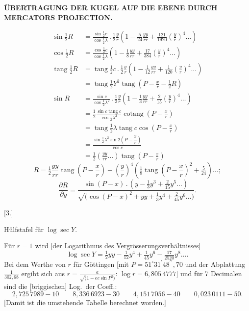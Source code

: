 \par\clearpage
\noindent\null\hfill{\fontsize{8}{10}\selectfont\textbf{ÜBERTRAGUNG DER KUGEL AUF DIE EBENE DURCH MERCATORS PROJECTION.}}\hfill{}\par\medskip

\noindent [so wird]
\[
\begin{aligned}
\sin\tfrac12R
 &=\frac{\sin\tfrac12 c}{\cos\tfrac12\lambda}\,.\,\tfrac12\frac yr
 \left(1-\tfrac5{24}\frac{yy}{rr}+\tfrac{121}{1920}\left(\frac yr\right)^4\ldots\right)\\
\cos\tfrac12R
 &=\frac{\cos\tfrac12 c}{\cos\tfrac12\lambda}
 \left(1-\tfrac18\frac{yy}{rr}+\tfrac{17}{384}\left(\frac yr\right)^4\ldots\right)\\
\operatorname{tang}\tfrac12R
 &=\operatorname{tang}\tfrac12c\,.\,\tfrac12\frac yr
 \left(1-\tfrac1{12}\frac{yy}{rr}+\tfrac1{120}\left(\frac yr\right)^4\ldots\right)\\
 &=\operatorname{tang}\tfrac12Y^2\operatorname{tang}\left(P-\frac xr-\tfrac12R\right)\\
\sin R&=\frac{\sin c}{\cos\tfrac12\lambda^2}\,.\,\tfrac12\frac yr
 \left(1-\tfrac13\frac{yy}{rr}+\tfrac2{15}\left(\frac yr\right)^4\ldots\right)\\
 &=\tfrac12\frac{\sin c\operatorname{tang}c}{\cos\tfrac12\lambda^2}
 \operatorname{cotang}\left(P-\frac xr\right)\\
 &=\operatorname{tang}\tfrac12\lambda\operatorname{tang}c\cos\left(P-\frac xr\right)\\
 &=\frac{\sin\tfrac12\lambda^2\sin2\left(P-\dfrac xr\right)}{\cos c}\\
 &=\tfrac12\left(\frac{yy}{rr}\ldots\right)\operatorname{tang}\left(P-\frac xr\right)
\end{aligned}
\]
\[
R=\tfrac12\frac{yy}{rr}\operatorname{tang}\left(P-\frac xr\right)
 -\left(\frac yr\right)^4\left(\tfrac18\operatorname{tang}\left(P-\frac xr\right)^2+\tfrac5{24}\right)\ldots;
\]
\noindent [für \(r=1\) ist]
\[
\frac{\partial R}{\partial y}=
\frac{\sin(P-x)\,.\,(y-\tfrac13y^3+\tfrac2{15}y^5\ldots)}
{\surd(\cos(P-x)^2+yy+\tfrac13y^4+\tfrac2{45}y^6\ldots)}.
\]

\begin{center}
[3.]\par\medskip
Hülfstafel für \(\log\sec Y\).
\end{center}
Für \(r=1\) wird [der Logarithmus des Vergrösserungsverhältnisses]
\[
\log\sec Y=\tfrac12 yy-\tfrac1{12}y^4+\tfrac1{45}y^6-\tfrac{17}{2520}y^8\ldots.
\]
Bei dem Werthe von \(r\) für Göttingen [mit \(P=51^\circ31^{\prime}48^{\prime\prime}{,}70\)
und der Abplattung \(\frac1{302{,}68}\) ergibt sich aus
\(r=\frac a{\surd(1-ee\sin P^2)}\): \(\log r=6{,}805\,4777\)] und für
7 Decimalen sind die [briggischen] Log.\ der Coeff.:
\[
2{,}725\,7989-10\qquad 8{,}336\,6923-30\qquad
4{,}151\,7056-40\qquad 0{,}023\,0111-50.
\]
[Damit ist die umstehende Tabelle berechnet worden.]

